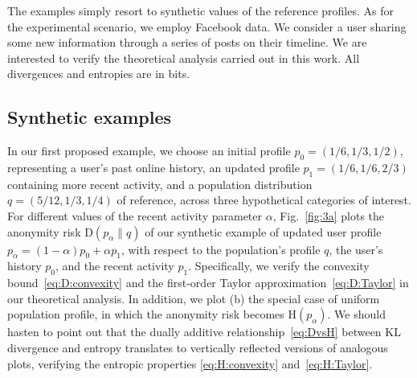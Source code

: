 The examples simply resort to synthetic values of the reference profiles. As for the experimental scenario, we employ Facebook data. We consider a user sharing some new information through a series of posts on their timeline. We are interested to verify the theoretical analysis carried out in this work. All divergences and entropies are in bits.

\subsection{Synthetic examples}

\noindent
In our first proposed example, we choose an initial profile $p_0 = (1/6, 1/3, 1/2)$, representing a user's past online history, an updated profile $p_1 = (1/6, 1/6, 2/3)$ containing more recent activity, and a population distribution $q=(5/12, 1/3, 1/4)$ of reference, across three hypothetical categories of interest. 
For different values of the recent activity parameter $\alpha$, Fig.~\ref{fig:3a} plots the anonymity risk $\mathrm{D}(p_\alpha\|q)$ of our synthetic example of updated user profile $p_\alpha=(1-\alpha)p_0+\alpha p_1$, with respect to the population's profile $q$, the user's history $p_0$, and the recent activity $p_1$. Specifically, we verify the convexity bound~\eqref{eq:D:convexity} and the first-order Taylor approximation~\eqref{eq:D:Taylor} in our theoretical analysis. In addition, we plot (b) the special case of uniform population profile, in which the anonymity risk becomes $\mathrm{H}(p_\alpha)$. We should hasten to point out that the dually additive relationship~\eqref{eq:DvsH} between KL divergence and entropy translates to vertically reflected versions of analogous plots, verifying the entropic properties \eqref{eq:H:convexity} and~\eqref{eq:H:Taylor}.
